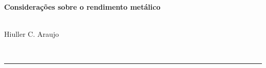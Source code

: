 \begin{center}
{\sffamily \begin{huge}\textbf{
	Considerações sobre o rendimento metálico
	}\end{huge}\\[10pt]
{Hiuller C. Araujo}
}\\
	\begin{abstract}
		Este trabalho apresenta os resultados de uma investigação realizada para elencar os parâmetros de processo com impacto no rendimento em aço da Aciaria 2. Os principais fatores que impactaram no rendimento metálico em 2013 foram: (a) o consumo de sucata tipo B; (b) consumo específico de sínter e (c) o consumo de ligas. 
		
		Foram desenvolvidos modelos estatísticos de regressão múltipla para identificar a causa na mudança de patamar do rendimento. A migração da sucata CB para TA foi associada à queda do rendimento metálico observada na Aciaria 2. Em seguida, foi desenvolvido outro modelo para explicar o rendimento metálico sem a influência da sucata tipo B em função dos diversos fatores. A análise deste modelo mostrou que cada o efeito da adição de ligas é de 0,30\% em rendimento para cada  kg/t enquanto que o efeito do sínter é de 0,48\% por kg/t.		
	\end{abstract}
	\rule{4in}{0.5pt}
\end{center}
